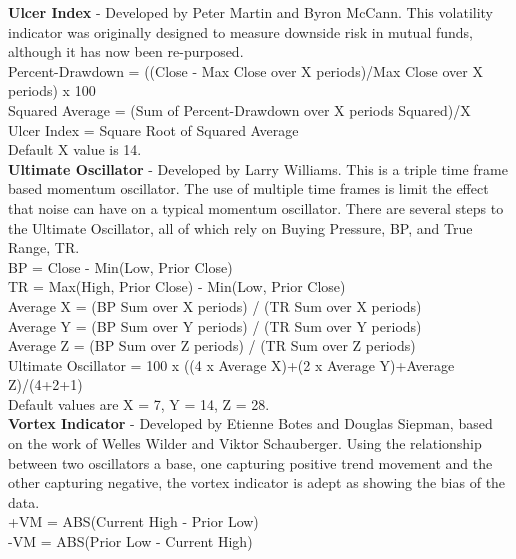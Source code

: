 \documentclass[12pt,a4paper]{article}
\begin{document}
\iffalse
[]
\fi

\noindent
\textbf{Ulcer Index} - Developed by Peter Martin and Byron McCann. This volatility indicator was originally designed to measure downside risk in mutual funds, although it has now been re-purposed.  \\

\noindent
Percent-Drawdown = ((Close - Max Close over X periods)/Max Close over X periods) x 100\\
Squared Average = (Sum of Percent-Drawdown over X periods Squared)/X\\
Ulcer Index = Square Root of Squared Average\\
Default X value is 14.\\

\iffalse
[]
\fi

\noindent
\textbf{Ultimate Oscillator} - Developed by Larry Williams. This is a triple time frame based momentum oscillator. The use of multiple time frames is limit the effect that noise can have on a typical momentum oscillator. There are several steps to the Ultimate Oscillator, all of which rely on Buying Pressure, BP, and True Range, TR.\\

\noindent
BP = Close - Min(Low, Prior Close)\\
TR = Max(High, Prior Close)  -  Min(Low, Prior Close)\\

\noindent
Average X = (BP Sum over X periods) / (TR Sum over X periods)\\
Average Y = (BP Sum over Y periods) / (TR Sum over Y periods)\\
Average Z = (BP Sum over Z periods) / (TR Sum over Z periods)\\

\noindent
Ultimate Oscillator = 100 x ((4 x Average X)+(2 x Average Y)+Average Z)/(4+2+1)\\
Default values are X = 7, Y = 14, Z = 28.\\

\iffalse
[]
\fi

\noindent
\textbf{Vortex Indicator} - Developed by Etienne Botes and Douglas Siepman, based on the work of Welles Wilder and Viktor Schauberger. Using the relationship between two oscillators a base, one capturing positive trend movement and the other capturing negative, the vortex indicator is adept as showing the bias of the data.\\

\noindent
+VM = ABS(Current High - Prior Low)\\
-VM = ABS(Prior Low - Current High)\\
\end{document}
